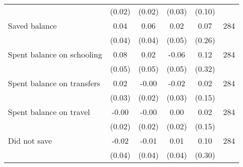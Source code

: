 \begin{table}[h]
{\begin{threeparttable}
\begin{tabular}{l*{5}{c}}
          &   (0.02)&   (0.02)&   (0.03)&   (0.10)&         \\
Saved balance&     0.04&     0.06&     0.02&     0.07&      284\\
          &   (0.04)&   (0.04)&   (0.05)&   (0.26)&         \\
Spent balance on schooling&     0.08&     0.02&    -0.06&     0.12&      284\\
          &   (0.05)&   (0.05)&   (0.05)&   (0.32)&         \\
Spent balance on transfers&     0.02&    -0.00&    -0.02&     0.02&      284\\
          &   (0.03)&   (0.02)&   (0.03)&   (0.15)&         \\
Spent balance on travel&    -0.00&    -0.00&     0.00&     0.02&      284\\
          &   (0.02)&   (0.02)&   (0.02)&   (0.15)&         \\
Did not save&    -0.02&    -0.01&     0.01&     0.10&      284\\
          &   (0.04)&   (0.04)&   (0.04)&   (0.30)&         \\
\bottomrule \end{tabular} \begin{tablenotes}[flushleft] \footnotesize \item  \end{tablenotes} \end{threeparttable} } \end{table}
